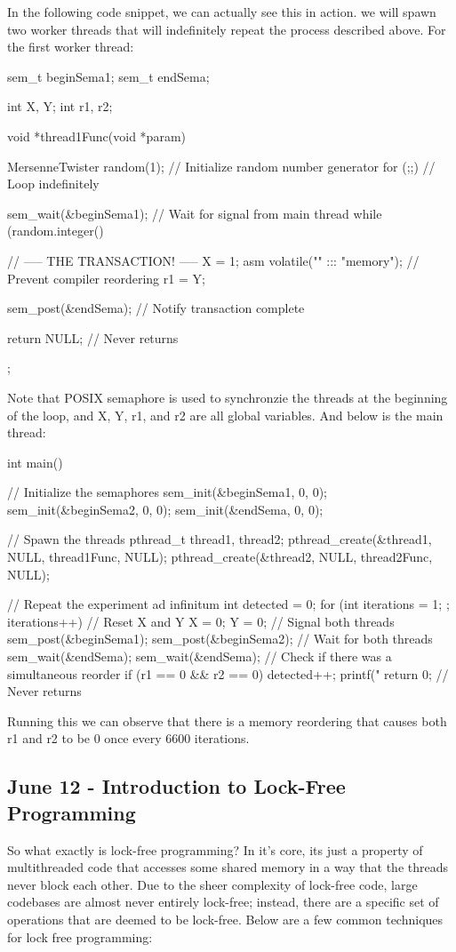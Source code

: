 \documentclass[11pt, a4paper]{article}
\theoremstyle{definition}
\theoremstyle{remark}
\begin{document}
In the following code snippet, we can actually see this in action. we will spawn two worker threads that will indefinitely repeat the process described above. For the first worker thread:
\newpage
\begin{ccode}
sem_t beginSema1;
sem_t endSema;

int X, Y;
int r1, r2;

void *thread1Func(void *param)
{
    MersenneTwister random(1);                // Initialize random number generator
    for (;;)                                  // Loop indefinitely
    {
        sem_wait(&beginSema1);                // Wait for signal from main thread
        while (random.integer() %

        // ----- THE TRANSACTION! -----
        X = 1;
        asm volatile("" ::: "memory");        // Prevent compiler reordering
        r1 = Y;

        sem_post(&endSema);                   // Notify transaction complete
    }
    return NULL;  // Never returns
};
\end{ccode}
Note that POSIX semaphore is used to synchronzie the threads at the beginning of the loop, and X, Y, r1, and r2 are all global variables. And below is the main thread:
\begin{ccode}
int main()
{
    // Initialize the semaphores
    sem_init(&beginSema1, 0, 0);
    sem_init(&beginSema2, 0, 0);
    sem_init(&endSema, 0, 0);

    // Spawn the threads
    pthread_t thread1, thread2;
    pthread_create(&thread1, NULL, thread1Func, NULL);
    pthread_create(&thread2, NULL, thread2Func, NULL);

    // Repeat the experiment ad infinitum
    int detected = 0;
    for (int iterations = 1; ; iterations++)
    {
        // Reset X and Y
        X = 0;
        Y = 0;
        // Signal both threads
        sem_post(&beginSema1);
        sem_post(&beginSema2);
        // Wait for both threads
        sem_wait(&endSema);
        sem_wait(&endSema);
        // Check if there was a simultaneous reorder
        if (r1 == 0 && r2 == 0)
        {
            detected++;
            printf("%
        }
    }
    return 0;  // Never returns
}
\end{ccode}
Running this we can observe that there is a memory reordering that causes both r1 and r2 to be 0 once every 6600 iterations.
\subsection{June 12 - Introduction to Lock-Free Programming}
So what exactly is lock-free programming? In it's core, its just a property of multithreaded code that accesses some shared memory in a way that the threads never block each other. Due to the sheer complexity of lock-free code,
large codebases are almost never entirely lock-free; instead, there are a specific set of operations that are deemed to be lock-free. Below are a few common techniques for lock free programming:
\end{document}
